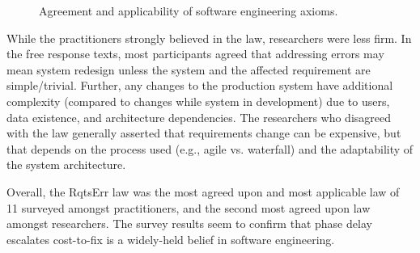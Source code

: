 \begin{figure}[!h]
\begin{center}
\end{center}
\caption{Agreement and applicability of software engineering axioms.}
\label{fig:survey_results}
\end{figure}

While the practitioners strongly believed in the law, researchers were less firm. In the free response texts, most participants agreed that addressing errors may mean system redesign unless the system and the affected requirement are simple/trivial. Further, any changes to the production system have additional complexity (compared to changes while system in development) due to users, data existence, and architecture dependencies. The researchers who disagreed with the law generally asserted that requirements change can be expensive, but that depends on the process used (e.g., agile vs. waterfall) and the adaptability of the system architecture.

Overall, the RqtsErr law was the most agreed upon and most applicable law of 11 surveyed amongst practitioners, and the second most agreed upon law amongst researchers. The survey results seem to confirm that phase delay escalates cost-to-fix is a widely-held belief in software engineering.